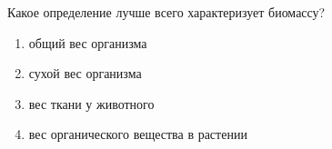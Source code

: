 
Какое определение лучше всего характеризует биомассу?

\begin{enumerate}
    \item общий вес организма
    \item сухой вес организма
    \item вес ткани у животного 
    \item вес органического вещества в растении
\end{enumerate}

\explanationSection

